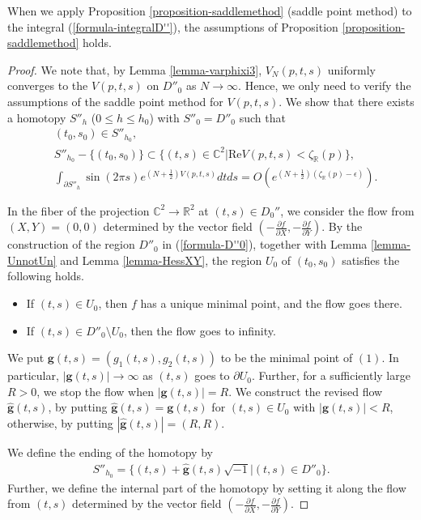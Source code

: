 \documentclass[12pt]{amsart}
\begin{document}
\begin{proposition} \label{propostion-checksaddle}
    When we apply Proposition \ref{proposition-saddlemethod} (saddle point method)  to the integral (\ref{formula-integralD''}), the assumptions of Proposition \ref{proposition-saddlemethod} holds. 
\end{proposition}
\begin{proof}
We note that, by Lemma \ref{lemma-varphixi3}, $V_N(p,t,s)$ uniformly converges to the $V(p,t,s)$ on $D''_0$ as $N\rightarrow \infty$. Hence,  we only need to verify the assumptions of the saddle point method for $V(p,t,s)$.  
 We show that there exists a homotopy $S''_h$ ($0\leq h\leq h_0 $) with $S''_0=D''_0$  such that 
\begin{align}
 &(t_0,s_0)\in S''_{h_0},  \label{saddle-1} \\ 
    &S''_{h_0}-\{(t_0,s_0)\}\subset \{(t,s)\in \mathbb{C}^2|\text{Re} V(p,t,s)<\zeta_\mathbb{R}(p)\}, \label{saddle-2} \\
    & \int_{\partial S''_{h}} \sin(2\pi s)e^{(N+\frac{1}{2})V(p,t,s)}dtds=O\left(e^{(N+\frac{1}{2})(\zeta_{\mathbb{R}}(p)-\epsilon)}\right). \label{saddle-3}
\end{align}


   In the fiber of the projection $\mathbb{C}^2\rightarrow \mathbb{R}^2$ at $(t,s)\in D_0''$, we consider the flow from $(X,Y)=(0,0)$ determined by the vector field $(-\frac{\partial f}{\partial X},-\frac{\partial f}{\partial Y})$. By the construction of the region $D''_0$ in (\ref{formula-D''0}), together with Lemma \ref{lemma-UnnotUn} and Lemma \ref{lemma-HessXY}, the region $U_0$ of $(t_0,s_0)$ satisfies the following holds. 
 \begin{itemize}
        \item[(1)] If $(t,s)\in U_0$, then $f$ has a unique minimal point, and the flow goes there.
        \item[(2)] If $(t,s)\in D''_0\setminus U_0$, then the flow goes to infinity. 
    \end{itemize}
We put $\mathbf{g}(t,s)=(g_1(t,s),g_2(t,s))$ to be the minimal point of $(1)$. In particular, $|\mathbf{g}(t,s)|\rightarrow \infty$ as $(t,s)$ goes to $\partial U_0$. Further, for a sufficiently large $R>0$, we stop the flow when $|\mathbf{g}(t,s)|=R$. We construct the revised flow $\hat{\mathbf{g}}(t,s)$, by putting $\hat{\mathbf{g}}(t,s)=\mathbf{g}(t,s)$ for $(t,s)\in U_0$ with $|\mathbf{g}(t,s)|<R$, otherwise, by putting $|\hat{\mathbf{g}}(t,s)|=(R,R)$. 

 We define the ending of the homotopy by
\begin{align}
    S''_{h_0}=\{(t,s)+\hat{\mathbf{g}}(t,s)\sqrt{-1}|(t,s)\in D''_0\}. 
\end{align}
Further, we define the internal part of the homotopy by setting it along the flow from $(t,s)$ determined by the vector field $\left(-\frac{\partial f}{\partial X},-\frac{\partial f}{\partial Y}\right)$. 


\end{proof}
\end{document}
